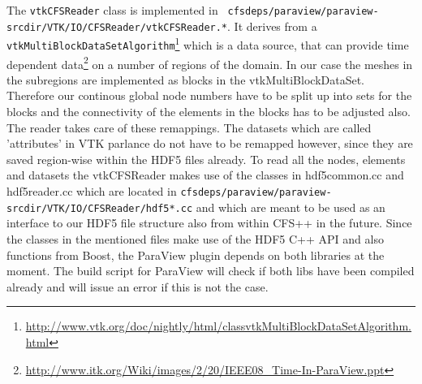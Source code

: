 The     {\tt     vtkCFSReader}     class    is     implemented     in     {\tt
  cfsdeps/paraview/paraview-srcdir/VTK/IO/CFSReader/vtkCFSReader.*}.        It
derives                     from                    a                     {\tt
  vtkMultiBlockDataSetAlgorithm}\footnote{\url{http://www.vtk.org/doc/nightly/html/classvtkMultiBlockDataSetAlgorithm.html}}
which    is   a    data   source,    that   can    provide   time    dependent
data\footnote{\url{http://www.itk.org/Wiki/images/2/20/IEEE08_Time-In-ParaView.ppt}}
\cite{Biddiscombe2007} on a number of regions  of the domain.  In our case the
meshes   in    the   subregions   are    implemented   as   blocks    in   the
vtkMultiBlockDataSet. Therefore our  continous global node numbers  have to be
split up into sets for the blocks  and the connectivity of the elements in the
blocks has to be adjusted also. The reader takes care of these remappings. The
datasets  which are  called 'attributes'  in VTK  parlance do  not have  to be
remapped  however, since  they are  saved  region-wise within  the HDF5  files
already. To read  all the nodes, elements and datasets  the vtkCFSReader makes
use of  the classes in  hdf5common.cc and  hdf5reader.cc which are  located in
{\tt cfsdeps/paraview/paraview-srcdir/VTK/IO/CFSReader/hdf5*.cc} and which are
meant to be used  as an interface to our HDF5 file  structure also from within
CFS++ in the future. Since the classes  in the mentioned files make use of the
HDF5 C++  API and also  functions from Boost,  the ParaView plugin  depends on
both libraries  at the moment.   The build script  for ParaView will  check if
both libs have  been compiled already and  will issue an error if  this is not
the case.

















